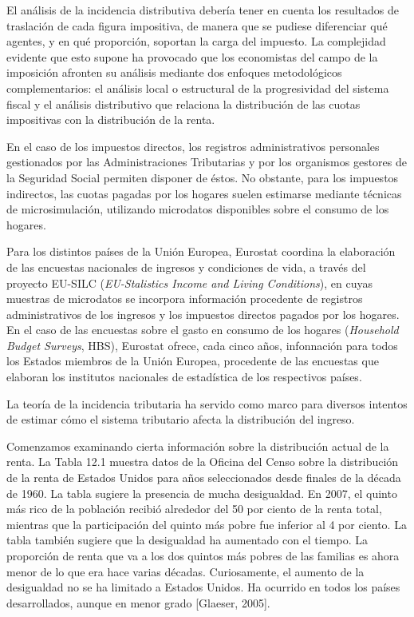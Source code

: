 \documentclass[10pt,a4paper]{article}
\begin{document}
El análisis de la incidencia distributiva debería tener en cuenta los resultados de traslación de cada figura impositiva, de manera que se pudiese diferenciar qué agentes, y en qué proporción, soportan la carga del impuesto. La complejidad evidente que esto supone ha provocado que los economistas del campo de la imposición afronten su análisis mediante dos enfoques metodológicos complementarios: el análisis local o estructural de la progresividad del sistema fiscal y el análisis distributivo que relaciona la distribución de las cuotas impositivas con la distribución de la renta. 


En el caso de los impuestos directos, los registros administrativos personales gestionados por las Administraciones Tributarias y por los organismos gestores de la Seguridad Social permiten disponer de éstos. No obstante, para los impuestos indirectos, las cuotas pagadas por los hogares suelen estimarse mediante técnicas de microsimulación, utilizando microdatos disponibles sobre el consumo de los hogares.

Para los distintos países de la Unión Europea, Eurostat coordina la elaboración de las encuestas nacionales de ingresos y condiciones de vida, a través del proyecto EU-SILC (\textit{EU-Stalistics Income and Living Conditions}), en cuyas muestras de microdatos se incorpora información procedente de registros administrativos de los ingresos y los impuestos directos pagados por los hogares. En el caso de las encuestas sobre el gasto en consumo de los hogares (\textit{Household Budget Surveys}, HBS), Eurostat ofrece, cada cinco años, infonnación para todos los Estados miembros de la Unión Europea, procedente de las encuestas que elaboran los institutos nacionales de estadística de los respectivos países.


La teoría de la incidencia tributaria ha servido como marco para diversos intentos de estimar cómo el sistema tributario afecta la distribución del ingreso.

Comenzamos examinando cierta información sobre la distribución actual de la renta. La Tabla 12.1 muestra datos de la Oficina del Censo sobre la distribución de la renta de Estados Unidos para años seleccionados desde finales de la década de 1960. La tabla sugiere la presencia de mucha desigualdad. En 2007, el quinto más rico de la población recibió alrededor del 50 por ciento de la renta total, mientras que la participación del quinto más pobre fue inferior al 4 por ciento. La tabla también sugiere que la desigualdad ha aumentado con el tiempo. La proporción de renta que va a los dos quintos más pobres de las familias es ahora menor de lo que era hace varias décadas. Curiosamente, el aumento de la desigualdad no se ha limitado a Estados Unidos. Ha ocurrido en todos los países desarrollados, aunque en menor grado [Glaeser, 2005].
\end{document}
